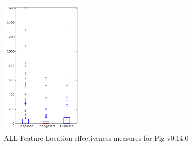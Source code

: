 
\begin{figure}[t]
\centering
\includegraphics[width=0.36\textwidth]{figures/flt/all_pig}
\caption{ALL Feature Location effectiveness measures for Pig v0.14.0}
\label{fig:flt:all:pig}
\end{figure}
